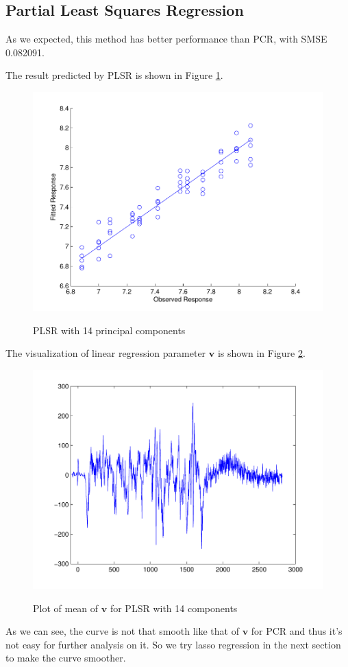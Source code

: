 \documentclass[a4paper]{article}
\newcommand{\bfv}{\mathbf{v}}
\begin{document}
\subsection{Partial Least Squares Regression}
As we expected, this method has better performance than PCR, with SMSE 0.082091. 

The result predicted by PLSR is shown in Figure \ref{pic6}.
\begin{figure}[h]
  \centering
  \includegraphics[width=.6\textwidth]{images/predict_PLSR.pdf}\\
  \caption{PLSR with 14 principal components}\label{pic6}
\end{figure}

The visualization of linear regression parameter $\bfv$ is shown in Figure \ref{pic7}.
\begin{figure}[h]
  \centering
  \includegraphics[width=.6\textwidth]{images/v_PLSR.pdf}\\
  \caption{Plot of mean of $\bfv$ for PLSR with 14 components}\label{pic7}
\end{figure}

As we can see, the curve is not that smooth like that of $\bfv$ for PCR and thus it's not easy for further analysis on it. So we try lasso regression in the next section to make the curve smoother. 
\end{document}
